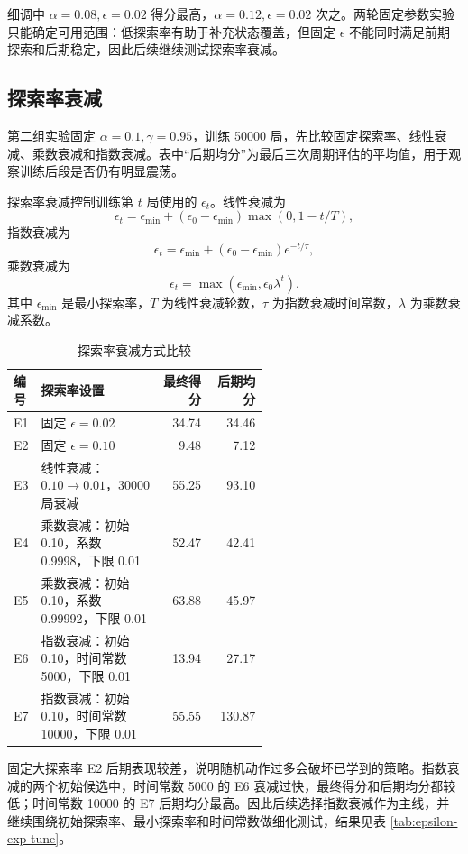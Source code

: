 \documentclass{zjureport}
\begin{document}
细调中 $\alpha=0.08,\epsilon=0.02$ 得分最高，$\alpha=0.12,\epsilon=0.02$ 次之。两轮固定参数实验只能确定可用范围：低探索率有助于补充状态覆盖，但固定 $\epsilon$ 不能同时满足前期探索和后期稳定，因此后续继续测试探索率衰减。

\subsection{探索率衰减}

第二组实验固定 $\alpha=0.1,\gamma=0.95$，训练 50000 局，先比较固定探索率、线性衰减、乘数衰减和指数衰减。表中“后期均分”为最后三次周期评估的平均值，用于观察训练后段是否仍有明显震荡。

探索率衰减控制训练第 $t$ 局使用的 $\epsilon_t$。线性衰减为
\[
\epsilon_t=\epsilon_{\min}+(\epsilon_0-\epsilon_{\min})\max(0,1-t/T),
\]
指数衰减为
\[
\epsilon_t=\epsilon_{\min}+(\epsilon_0-\epsilon_{\min})e^{-t/\tau},
\]
乘数衰减为
\[
\epsilon_t=\max(\epsilon_{\min},\epsilon_0\lambda^t).
\]
其中 $\epsilon_{\min}$ 是最小探索率，$T$ 为线性衰减轮数，$\tau$ 为指数衰减时间常数，$\lambda$ 为乘数衰减系数。

\begin{table}[H]
    \centering
    \small
    \caption{探索率衰减方式比较}
    \label{tab:epsilon-decay-method}
    \begin{tabular}{p{0.08\linewidth}p{0.48\linewidth}rr}
        \toprule
        编号 & 探索率设置 & 最终得分 & 后期均分 \\
        \midrule
        E1 & 固定 $\epsilon=0.02$ & 34.74 & 34.46 \\
        E2 & 固定 $\epsilon=0.10$ & 9.48 & 7.12 \\
        E3 & 线性衰减：$0.10\rightarrow0.01$，30000 局衰减 & 55.25 & 93.10 \\
        E4 & 乘数衰减：初始 0.10，系数 0.9998，下限 0.01 & 52.47 & 42.41 \\
        E5 & 乘数衰减：初始 0.10，系数 0.99992，下限 0.01 & 63.88 & 45.97 \\
        E6 & 指数衰减：初始 0.10，时间常数 5000，下限 0.01 & 13.94 & 27.17 \\
        E7 & 指数衰减：初始 0.10，时间常数 10000，下限 0.01 & 55.55 & 130.87 \\
        \bottomrule
    \end{tabular}
\end{table}

固定大探索率 E2 后期表现较差，说明随机动作过多会破坏已学到的策略。指数衰减的两个初始候选中，时间常数 5000 的 E6 衰减过快，最终得分和后期均分都较低；时间常数 10000 的 E7 后期均分最高。因此后续选择指数衰减作为主线，并继续围绕初始探索率、最小探索率和时间常数做细化测试，结果见表 \ref{tab:epsilon-exp-tune}。
\end{document}
